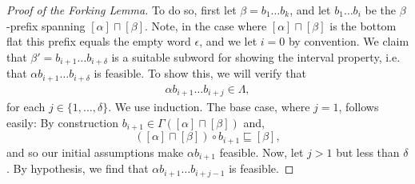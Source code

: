\documentclass[10pt,a4paper]{amsart}
\newcommand{\glang}{\Lambda}
\begin{document}
\begin{proof}[Proof of the Forking Lemma]
    To do so, first let $\beta = b_1\ldots b_k$, and let $b_1 \ldots b_i$ be the $\beta$-prefix spanning $[\alpha]\sqcap [\beta]$.
    Note, in the case where $[\alpha] \sqcap [\beta]$ is the bottom flat this prefix equals the empty word $\epsilon$, and we let $i = 0$ by convention.
    We claim that $\beta' = b_{i+1}\ldots b_{i+\delta}$ is a suitable subword for showing the interval property, i.e. that $\alpha b_{i+1}\ldots b_{i+\delta}$ is feasible.
    To show this, we will verify that
    \begin{align*}
        \alpha b_{i+1} \ldots b_{i+j}\in\glang,
    \end{align*}
    for each $j \in \{1, \ldots, \delta\}$.
    We use induction.
    The base case, where $j = 1$, follows easily:
    By construction $b_{i+1} \in \Gamma([\alpha]\sqcap[\beta])$ and,
    \[
        ([\alpha]\sqcap[\beta])\circ b_{i+1} \sqsubseteq [\beta],
    \]
    and so our initial assumptions make $\alpha b_{i+1}$ feasible.
    Now, let $j > 1$ but less than $\delta$.
    By hypothesis, we find that $\alpha b_{i+1}\ldots b_{i + j - 1}$ is feasible.
\fi
\end{proof}
\end{document}
